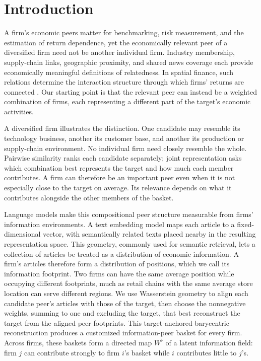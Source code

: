 \section*{Introduction}
\label{sec:introduction}

A firm's economic peers matter for benchmarking, risk measurement, and the
estimation of return dependence, yet the economically relevant peer of a
diversified firm need not be another individual firm.
Industry membership, supply-chain links, geographic proximity, and shared news
coverage each provide economically meaningful definitions of relatedness.
In spatial finance, such relations determine the interaction structure through
which firms' returns are connected
\citep{fernandez_spatial_2011,kou_asset_2018,ge_news-implied_2023}.
Our starting point is that the relevant peer can instead be a weighted
combination of firms, each representing a different part of the target's
economic activities.

A diversified firm illustrates the distinction.
One candidate may resemble its technology business, another its customer base,
and another its production or supply-chain environment.
No individual firm need closely resemble the whole.
Pairwise similarity ranks each candidate separately; joint representation asks
which combination best represents the target and how much each member
contributes.
A firm can therefore be an important peer even when it is not especially close
to the target on average.
Its relevance depends on what it contributes alongside the other members of the
basket.

Language models make this compositional peer structure measurable from firms'
information environments.
A text embedding model maps each article to a fixed-dimensional vector, with
semantically related texts placed nearby in the resulting representation space.
This geometry, commonly used for semantic retrieval, lets a collection of
articles be treated as a distribution of economic information.
A firm's articles therefore form a distribution of positions, which we call its
information footprint.
Two firms can have the same average position while occupying different
footprints, much as retail chains with the same average store location can
serve different regions.
We use Wasserstein geometry to align each candidate peer's articles with those
of the target, then choose the nonnegative weights, summing to one and
excluding the target, that best reconstruct the target from the aligned peer
footprints.
This target-anchored barycentric reconstruction produces a customized
information-peer basket for every firm.
Across firms, these baskets form a directed map $W^\flat$ of a latent
information field: firm $j$ can contribute strongly to firm $i$'s basket while
$i$ contributes little to $j$'s.

